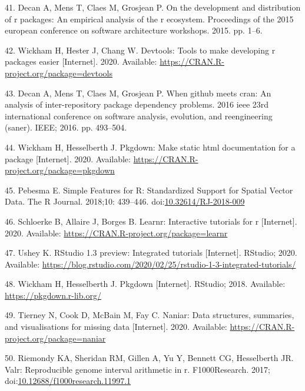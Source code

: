\documentclass[10pt,letterpaper]{article}
\begin{document}
\leavevmode\hypertarget{ref-decan2015}{}%
41. Decan A, Mens T, Claes M, Grosjean P. On the development and
distribution of r packages: An empirical analysis of the r ecosystem.
Proceedings of the 2015 european conference on software architecture
workshops. 2015. pp. 1--6.

\leavevmode\hypertarget{ref-devtools}{}%
42. Wickham H, Hester J, Chang W. Devtools: Tools to make developing r
packages easier {[}Internet{]}. 2020. Available:
\url{https://CRAN.R-project.org/package=devtools}

\leavevmode\hypertarget{ref-decan2016}{}%
43. Decan A, Mens T, Claes M, Grosjean P. When github meets cran: An
analysis of inter-repository package dependency problems. 2016 ieee 23rd
international conference on software analysis, evolution, and
reengineering (saner). IEEE; 2016. pp. 493--504.

\leavevmode\hypertarget{ref-pkgdown}{}%
44. Wickham H, Hesselberth J. Pkgdown: Make static html documentation
for a package {[}Internet{]}. 2020. Available:
\url{https://CRAN.R-project.org/package=pkgdown}

\leavevmode\hypertarget{ref-sf}{}%
45. Pebesma E. Simple Features for R: Standardized Support for Spatial
Vector Data. The R Journal. 2018;10: 439--446.
doi:\href{https://doi.org/10.32614/RJ-2018-009}{10.32614/RJ-2018-009}

\leavevmode\hypertarget{ref-learnr}{}%
46. Schloerke B, Allaire J, Borges B. Learnr: Interactive tutorials for
r {[}Internet{]}. 2020. Available:
\url{https://CRAN.R-project.org/package=learnr}

\leavevmode\hypertarget{ref-ushey2020}{}%
47. Ushey K. RStudio 1.3 preview: Integrated tutorials {[}Internet{]}.
RStudio; 2020. Available:
\url{https://blog.rstudio.com/2020/02/25/rstudio-1-3-integrated-tutorials/}

\leavevmode\hypertarget{ref-pkgdownweb}{}%
48. Wickham H, Hesselberth J. Pkgdown {[}Internet{]}. RStudio; 2018.
Available: \url{https://pkgdown.r-lib.org/}

\leavevmode\hypertarget{ref-naniar}{}%
49. Tierney N, Cook D, McBain M, Fay C. Naniar: Data structures,
summaries, and visualisations for missing data {[}Internet{]}. 2020.
Available: \url{https://CRAN.R-project.org/package=naniar}

\leavevmode\hypertarget{ref-valr}{}%
50. Riemondy KA, Sheridan RM, Gillen A, Yu Y, Bennett CG, Hesselberth
JR. Valr: Reproducible genome interval arithmetic in r. F1000Research.
2017;
doi:\href{https://doi.org/10.12688/f1000research.11997.1}{10.12688/f1000research.11997.1}
\end{document}
